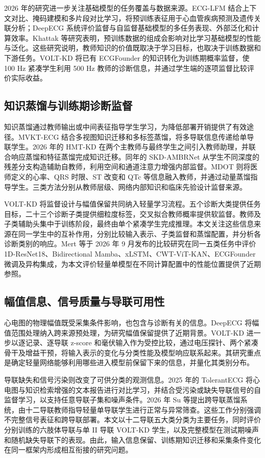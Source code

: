 \documentclass[11pt,a4paper,UTF8,fontset=windows]{ctexart}
\begin{document}
2026 年的研究进一步关注基础模型的任务覆盖与数据来源。ECG-LFM 结合上下文对比、掩码建模和多片段对比学习，将预训练表征用于心血管疾病预测及遗传关联分析\cite{lin2026}；DeepECG 系统评价监督与自监督基础模型的多任务表现、外部泛化和计算效率\cite{nolin2026}。Khattak 等研究表明，预训练数据的组成会影响对比学习基础模型的性能与泛化\cite{khattak2026}。这些研究说明，教师知识的价值既取决于学习目标，也取决于训练数据和下游任务。VOLT-KD 将已有 ECGFounder 的知识转化为训练期概率监督，使 100 Hz 紧凑学生利用 500 Hz 教师的诊断信息，并通过学生端的逐项监督比较评价实际收益。

\subsection{知识蒸馏与训练期诊断监督}
知识蒸馏通过教师输出或中间表征指导学生学习，为降低部署开销提供了有效途径。MVKT-ECG 结合多视图知识迁移和多标签蒸馏，将多导联信息传递给单导联学生\cite{qin2023}。2026 年的 HMT-KD 在两个主教师与最终学生之间引入教师助理，并联合响应蒸馏和特征蒸馏完成知识迁移\cite{beigzadeh2026}。同年的 SKD-AMBRNet 从学生不同深度的残差分支构造辅助自教师，利用空间和通道注意力增强内部监督\cite{qian2026}。MDOT 则将医师定义的心率、QRS 时限、ST 改变和 QTc 等信息融入教师，并通过动量蒸馏指导学生\cite{yisimitila2025}。三类方法分别从教师层级、网络内部知识和临床先验设计监督来源。

VOLT-KD 将监督设计与幅值保留共同纳入轻量学习流程。五个诊断大类提供任务目标，二十三个诊断子类提供细粒度标签，交叉拟合教师概率提供软监督。教师及子类辅助头集中于训练阶段，最终由单个紧凑学生完成推理。本文关注这些信息来源在同一学生中的互补作用，分别比较输入表示、子类监督和蒸馏配置，并分析各诊断类别的响应。Mert 等于 2026 年 9 月发布的比较研究在同一五类任务中评价 1D-ResNet18、Bidirectional Mamba、xLSTM、CWT-ViT-KAN、ECGFounder 微调及异构集成\cite{mert2026}，为本文评价轻量单模型在不同计算配置中的性能位置提供了近期参照。

\subsection{幅值信息、信号质量与导联可用性}
心电图的物理幅值既受采集条件影响，也包含与诊断有关的信息。DeepECG 将幅值范围处理纳入跨来源预处理\cite{nolin2026}，为研究幅值保留提供了近期背景。VOLT-KD 进一步以逐记录、逐导联 z-score 和毫伏输入作为受控比较，通过电压探针、两个紧凑骨干及增益干预，将输入表示的变化与分类性能及模型响应联系起来。其研究重点是确定轻量网络能够利用哪些进入模型前保留下来的信息，并量化其类别分布。

导联缺失和信号污染则改变了可供分类的观测信息。2025 年的 TolerantECG 将心电图与知识检索增强的文本报告进行对比学习，并结合受污染或缺失导联信号的自监督学习，以支持任意导联子集和噪声条件\cite{nguyen2025}。2026 年 Su 等提出跨导联蒸馏系统，由十二导联教师指导轻量单导联学生进行正常与异常筛查\cite{su2026}。这些工作分别强调不完整信号表征和跨导联部署。本文以十二导联五大类分类为主要任务，同时评价分别训练的六肢体导联与单 II 导联 VOLT-KD 学生，以及完整模型在测试期噪声和随机缺失导联下的表现。由此，输入信息保留、训练期知识迁移和采集条件变化在同一框架内形成相互衔接的研究问题。
\end{document}
